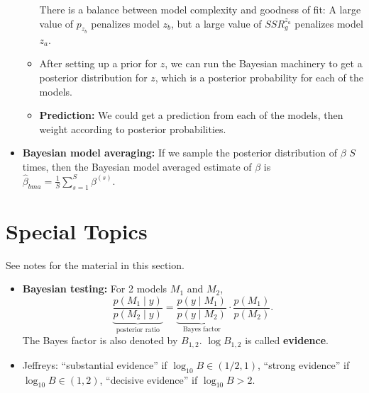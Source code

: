 \documentclass[twoside]{article}
\newcommand{\dis}{\displaystyle}
\begin{document}
\begin{itemize}
\begin{itemize}
There is a balance between model complexity and goodness of fit: A large value of $p_{z_b}$ penalizes model $z_b$, but a large value of $SSR_g^{z_a}$ penalizes model $z_a$.

\item After setting up a prior for $z$, we can run the Bayesian machinery to get a posterior distribution for $z$, which is a posterior probability for each of the models.

\item \textbf{Prediction:} We could get a prediction from each of the models, then weight according to posterior probabilities.

\end{itemize}

\item \textbf{Bayesian model averaging:} If we sample the posterior distribution of $\beta$ $S$ times, then the Bayesian model averaged estimate of $\beta$ is $\hat{\beta}_{bma} = \dis\frac{1}{S}\sum_{s=1}^S \beta^{(s)}$.



\end{itemize}

\section{Special Topics}
See notes for the material in this section.

\begin{itemize}
\item \textbf{Bayesian testing:} For 2 models $M_1$ and $M_2$,
\begin{equation*}
\underbrace{\frac{p(M_1 \mid y)}{p(M_2 \mid y)}}_{\text{posterior ratio}} = \underbrace{\frac{p(y \mid M_1)}{p(y \mid M_2)}}_{\text{Bayes factor}} \cdot \frac{p(M_1)}{p(M_2)}.
\end{equation*}
The Bayes factor is also denoted by $B_{1,2}$. $\log B_{1,2}$ is called \textbf{evidence}.

\item Jeffreys: ``substantial evidence'' if $\log_{10} B \in (1/2, 1)$, ``strong evidence'' if $\log_{10} B \in (1, 2)$, ``decisive evidence'' if $\log_{10} B > 2$.


\end{itemize}
\end{document}
